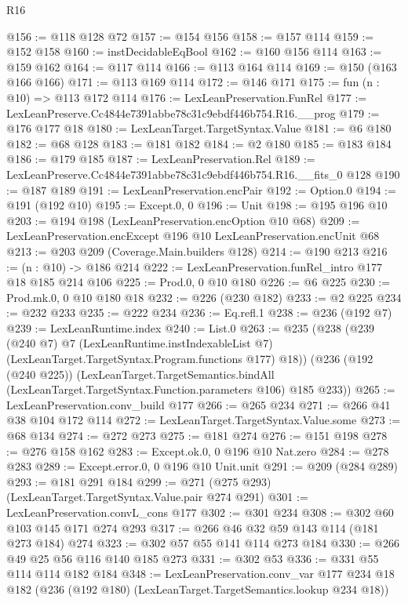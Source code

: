 \begin{lexlean}{R16}
\begin{coremodule}
@156 := @118 @128 @72
@157 := @154 @156
@158 := @157 @114
@159 := @152 @158
@160 := instDecidableEqBool
@162 := @160 @156 @114
@163 := @159 @162
@164 := @117 @114
@166 := @113 @164 @114
@169 := @150 (@163 @166 @166)
@171 := @113 @169 @114
@172 := @146 @171
@175 := fun (n : @10) => @113 @172 @114
@176 := LexLeanPreservation.FunRel
@177 := LexLeanPreserve.Cc4844e7391abbe78c31c9ebdf446b754.R16.__prog
@179 := @176 @177 @18
@180 := LexLeanTarget.TargetSyntax.Value
@181 := @6 @180
@182 := @68 @128
@183 := @181 @182
@184 := @2 @180
@185 := @183 @184
@186 := @179 @185
@187 := LexLeanPreservation.Rel
@189 := LexLeanPreserve.Cc4844e7391abbe78c31c9ebdf446b754.R16.__fits_0 @128
@190 := @187 @189
@191 := LexLeanPreservation.encPair
@192 := Option.{0}
@194 := @191 (@192 @10)
@195 := Except.{0, 0}
@196 := Unit
@198 := @195 @196 @10
@203 := @194 @198 (LexLeanPreservation.encOption @10 @68)
@209 := LexLeanPreservation.encExcept @196 @10 LexLeanPreservation.encUnit @68
@213 := @203 @209 (Coverage.Main.builders @128)
@214 := @190 @213
@216 := (n : @10) -> @186 @214
@222 := LexLeanPreservation.funRel_intro @177 @18 @185 @214 @106
@225 := Prod.{0, 0} @10 @180
@226 := @6 @225
@230 := Prod.mk.{0, 0} @10 @180 @18
@232 := @226 (@230 @182)
@233 := @2 @225
@234 := @232 @233
@235 := @222 @234
@236 := Eq.refl.{1}
@238 := @236 (@192 @7)
@239 := LexLeanRuntime.index
@240 := List.{0}
@263 := @235
    (@238
      (@239
        (@240 @7)
        @7
        (LexLeanRuntime.instIndexableList @7)
        (LexLeanTarget.TargetSyntax.Program.functions @177)
        @18))
    (@236
      (@192 (@240 @225))
      (LexLeanTarget.TargetSemantics.bindAll
        (LexLeanTarget.TargetSyntax.Function.parameters @106)
        @185
        @233))
@265 := LexLeanPreservation.conv_build @177
@266 := @265 @234
@271 := @266 @41 @38 @104 @172 @114
@272 := LexLeanTarget.TargetSyntax.Value.some
@273 := @68 @134
@274 := @272 @273
@275 := @181 @274
@276 := @151 @198
@278 := @276 @158 @162
@283 := Except.ok.{0, 0} @196 @10 Nat.zero
@284 := @278 @283
@289 := Except.error.{0, 0} @196 @10 Unit.unit
@291 := @209 (@284 @289)
@293 := @181 @291 @184
@299 := @271 (@275 @293) (LexLeanTarget.TargetSyntax.Value.pair @274 @291)
@301 := LexLeanPreservation.convL_cons @177
@302 := @301 @234
@308 := @302 @60 @103 @145 @171 @274 @293
@317 := @266 @46 @32 @59 @143 @114 (@181 @273 @184) @274
@323 := @302 @57 @55 @141 @114 @273 @184
@330 := @266 @49 @25 @56 @116 @140 @185 @273
@331 := @302 @53
@336 := @331 @55 @114 @114 @182 @184
@348 := LexLeanPreservation.conv_var
    @177
    @234
    @18
    @182
    (@236 (@192 @180) (LexLeanTarget.TargetSemantics.lookup @234 @18))

\end{coremodule}
\end{lexlean}
